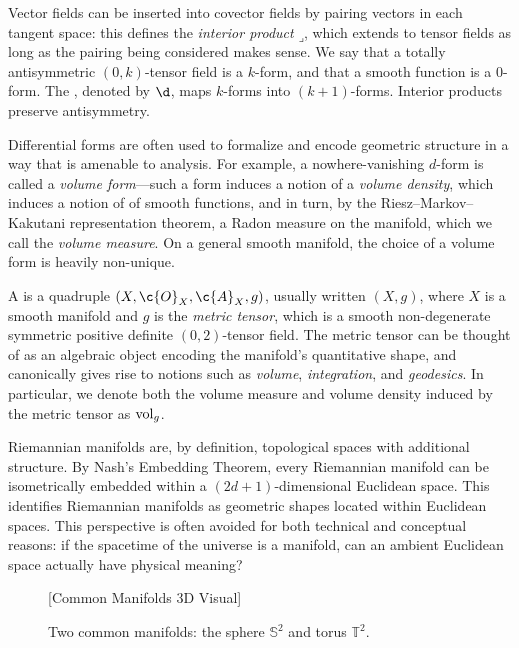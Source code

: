 \documentclass[11pt]{book}
\begin{document}
Vector fields can be inserted into covector fields by pairing vectors in each tangent space: this defines the \emph{interior product} $\mathbin{\lrcorner}$, which extends to tensor fields as long as the pairing being considered makes sense.
We say that a totally antisymmetric $(0,k)$-tensor field is a $k$-form, and that a smooth function is a $0$-form.
The , denoted by $\d$, maps $k$-forms into $(k+1)$-forms.
Interior products preserve antisymmetry.

Differential forms are often used to formalize and encode geometric structure in a way that is amenable to analysis.
For example, a nowhere-vanishing $d$-form is called a \emph{volume form}---such a form induces a notion of a \emph{volume density}, which induces a notion of  of smooth functions, and in turn, by the Riesz--Markov--Kakutani representation theorem, a Radon measure on the manifold, which we call the \emph{volume measure}.
On a general smooth manifold, the choice of a volume form is heavily non-unique.

A  is a quadruple $(X,\c{O}_X,\c{A}_X,g)$, usually written $(X,g)$, where $X$ is a smooth manifold and $g$ is the \emph{metric tensor}, which is a smooth non-degenerate symmetric positive definite $(0,2)$-tensor field.
The metric tensor can be thought of as an algebraic object encoding the manifold's quantitative shape, and canonically gives rise to notions such as \emph{volume}, \emph{integration}, and \emph{geodesics}.
In particular, we denote both the volume measure and volume density induced by the metric tensor as $\operatorname{vol}_g$.

Riemannian manifolds are, by definition, topological spaces with additional structure.
By Nash's Embedding Theorem, every Riemannian manifold can be isometrically embedded within a $(2d+1)$-dimensional Euclidean space.
This identifies Riemannian manifolds as geometric shapes located within Euclidean spaces.
This perspective is often avoided for both technical and conceptual reasons: if the spacetime of the universe is a manifold, can an ambient Euclidean space actually have physical meaning?

\begin{figure}
\vspace*{10ex}
[Common Manifolds 3D Visual]
\vspace*{10ex}
\caption{Two common manifolds: the sphere $\mathbb{S}^2$ and torus $\mathbb{T}^2$.}
\label{fig:common-manifolds}
\end{figure}
\end{document}
